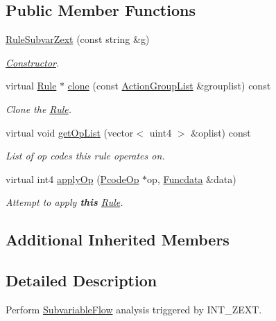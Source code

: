 \subsection*{Public Member Functions}
\begin{DoxyCompactItemize}
\item 
\mbox{\hyperlink{class_rule_subvar_zext_a6e535e64ef65b3d0e1bc42a95513c727}{Rule\+Subvar\+Zext}} (const string \&g)
\begin{DoxyCompactList}\small\item\em \mbox{\hyperlink{class_constructor}{Constructor}}. \end{DoxyCompactList}\item 
virtual \mbox{\hyperlink{class_rule}{Rule}} $\ast$ \mbox{\hyperlink{class_rule_subvar_zext_a2838537725e8d3dcb0c6bc0ce8fc1958}{clone}} (const \mbox{\hyperlink{class_action_group_list}{Action\+Group\+List}} \&grouplist) const
\begin{DoxyCompactList}\small\item\em Clone the \mbox{\hyperlink{class_rule}{Rule}}. \end{DoxyCompactList}\item 
virtual void \mbox{\hyperlink{class_rule_subvar_zext_aa109a86b21629b300a8650a94d47610d}{get\+Op\+List}} (vector$<$ uint4 $>$ \&oplist) const
\begin{DoxyCompactList}\small\item\em List of op codes this rule operates on. \end{DoxyCompactList}\item 
virtual int4 \mbox{\hyperlink{class_rule_subvar_zext_a9336da44138d6e55d5702de806649402}{apply\+Op}} (\mbox{\hyperlink{class_pcode_op}{Pcode\+Op}} $\ast$op, \mbox{\hyperlink{class_funcdata}{Funcdata}} \&data)
\begin{DoxyCompactList}\small\item\em Attempt to apply {\bfseries{this}} \mbox{\hyperlink{class_rule}{Rule}}. \end{DoxyCompactList}\end{DoxyCompactItemize}
\subsection*{Additional Inherited Members}


\subsection{Detailed Description}
Perform \mbox{\hyperlink{class_subvariable_flow}{Subvariable\+Flow}} analysis triggered by I\+N\+T\+\_\+\+Z\+E\+XT. 


